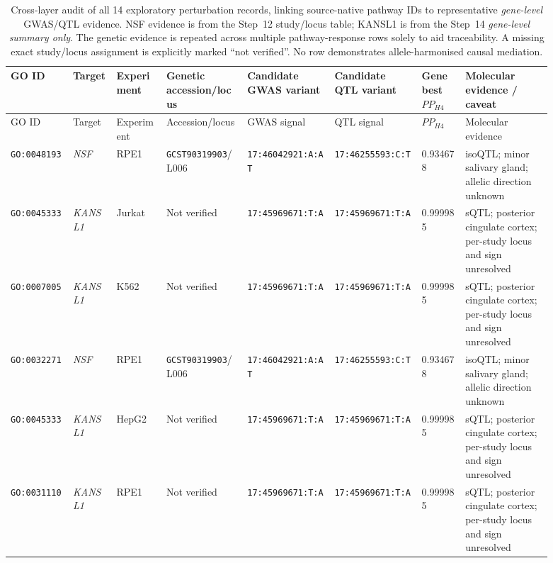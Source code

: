 \documentclass[11pt,a4paper]{article}
\begin{document}
\begin{landscape}
\begingroup\scriptsize\setlength{\tabcolsep}{2.5pt}
\begin{longtable}{@{}p{0.105\linewidth}p{0.075\linewidth}p{0.08\linewidth}p{0.135\linewidth}p{0.14\linewidth}p{0.14\linewidth}p{0.07\linewidth}p{0.145\linewidth}@{}}
\caption{Cross-layer audit of all 14 exploratory perturbation records, linking source-native pathway IDs to representative \emph{gene-level} GWAS/QTL evidence. NSF evidence is from the Step~12 study/locus table; KANSL1 is from the Step~14 \emph{gene-level summary only}. The genetic evidence is repeated across multiple pathway-response rows solely to aid traceability. A missing exact study/locus assignment is explicitly marked ``not verified''. No row demonstrates allele-harmonised causal mediation.}
\label{tab:step17_all14_linked}\\
\toprule
GO ID & Target & Experiment & Genetic accession/locus & Candidate GWAS variant & Candidate QTL variant & Gene best $PP_{H4}$ & Molecular evidence / caveat\\
\midrule\endfirsthead
\toprule GO ID & Target & Experiment & Accession/locus & GWAS signal & QTL signal & $PP_{H4}$ & Molecular evidence\\
\midrule\endhead
\bottomrule\endlastfoot
\texttt{GO:0048193} & \textit{NSF} & RPE1 & \texttt{GCST90319903}/L006 & \texttt{17:46042921:A:AT} & \texttt{17:46255593:C:T} & 0.934678 & isoQTL; minor salivary gland; allelic direction unknown \\
\texttt{GO:0045333} & \textit{KANSL1} & Jurkat & Not verified & \texttt{17:45969671:T:A} & \texttt{17:45969671:T:A} & 0.999985 & sQTL; posterior cingulate cortex; per-study locus and sign unresolved \\
\texttt{GO:0007005} & \textit{KANSL1} & K562 & Not verified & \texttt{17:45969671:T:A} & \texttt{17:45969671:T:A} & 0.999985 & sQTL; posterior cingulate cortex; per-study locus and sign unresolved \\
\texttt{GO:0032271} & \textit{NSF} & RPE1 & \texttt{GCST90319903}/L006 & \texttt{17:46042921:A:AT} & \texttt{17:46255593:C:T} & 0.934678 & isoQTL; minor salivary gland; allelic direction unknown \\
\texttt{GO:0045333} & \textit{KANSL1} & HepG2 & Not verified & \texttt{17:45969671:T:A} & \texttt{17:45969671:T:A} & 0.999985 & sQTL; posterior cingulate cortex; per-study locus and sign unresolved \\
\texttt{GO:0031110} & \textit{KANSL1} & RPE1 & Not verified & \texttt{17:45969671:T:A} & \texttt{17:45969671:T:A} & 0.999985 & sQTL; posterior cingulate cortex; per-study locus and sign unresolved \\

\end{longtable}
\end{landscape}
\end{document}
